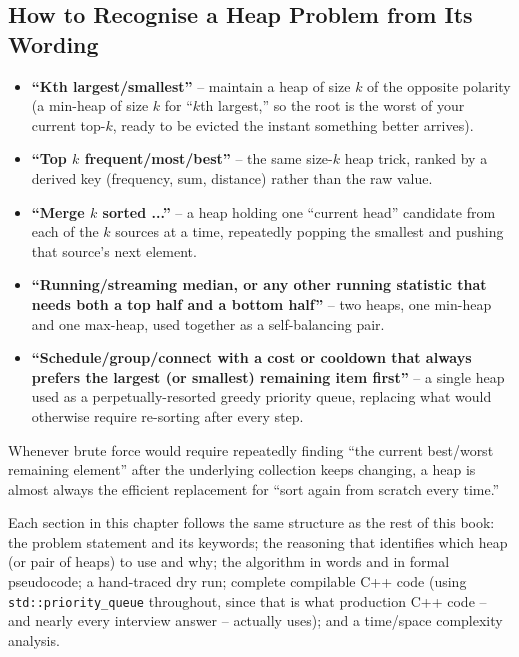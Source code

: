 \subsection*{How to Recognise a Heap Problem from Its Wording}

\begin{patternbox}
\begin{itemize}
  \item \textbf{``Kth largest/smallest''} -- maintain a heap of size $k$
        of the opposite polarity (a min-heap of size $k$ for ``$k$th
        largest,'' so the root is the worst of your current top-$k$, ready
        to be evicted the instant something better arrives).
  \item \textbf{``Top $k$ frequent/most/best''} -- the same size-$k$ heap
        trick, ranked by a derived key (frequency, sum, distance) rather
        than the raw value.
  \item \textbf{``Merge $k$ sorted ...''} -- a heap holding one
        ``current head'' candidate from each of the $k$ sources at a time,
        repeatedly popping the smallest and pushing that source's next
        element.
  \item \textbf{``Running/streaming median, or any other running
        statistic that needs both a top half and a bottom half''} -- two
        heaps, one min-heap and one max-heap, used together as a
        self-balancing pair.
  \item \textbf{``Schedule/group/connect with a cost or cooldown that
        always prefers the largest (or smallest) remaining item first''}
        -- a single heap used as a perpetually-resorted greedy priority
        queue, replacing what would otherwise require re-sorting after
        every step.
\end{itemize}
Whenever brute force would require repeatedly finding ``the current
best/worst remaining element'' after the underlying collection keeps
changing, a heap is almost always the efficient replacement for ``sort
again from scratch every time.''
\end{patternbox}

Each section in this chapter follows the same structure as the rest of
this book: the problem statement and its keywords; the reasoning that
identifies which heap (or pair of heaps) to use and why; the algorithm in
words and in formal pseudocode; a hand-traced dry run; complete compilable
C++ code (using \texttt{std::priority\_queue} throughout, since that is
what production C++ code -- and nearly every interview answer -- actually
uses); and a time/space complexity analysis.

